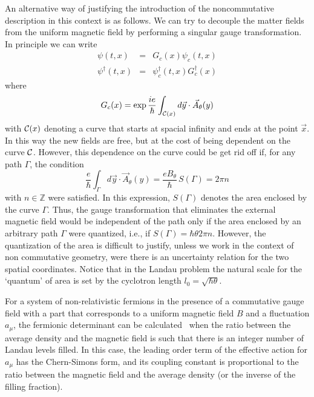\documentclass[a4paper,12pt]{article}
\begin{document}
An alternative way of justifying the introduction of the
noncommutative description in this context is as follows. We can
try
to decouple the matter fields from the uniform magnetic field by
performing a singular gauge transformation. In principle we can
write
\begin{eqnarray}
 \psi (t,x) &=& G_c (x) \psi_c(t,x) \nonumber \\
\psi^\dagger (t,x) &=&  \psi_c^\dagger (t,x) G_c^\dagger (x)
\end{eqnarray}
where
\begin{equation}
G_c(x)= \exp{{\frac{ie}{\hbar}}\int_{{\cal C}(x)} d{\vec
y}\cdot{\vec A}_{\theta}(y)}
\end{equation}
with ${\cal C}(x)$ denoting a curve that starts at spacial infinity
and ends at the point $\vec x$.  In this way the new fields are
free,
but at the cost of being dependent on the curve $\cal C$. However,
this dependence on the curve could be get rid off if, for any path
$\Gamma$, the condition
\begin{equation}
{{\frac{e}{\hbar}}\int_{\Gamma} d{\vec y} \cdot {\vec A}_\theta
(y)}= 
{\frac{e B_\theta}{\hbar}} \, S(\Gamma)= 2\pi n
\end{equation}
with $n \in \mathbb{Z}$ were satisfied. In this expression,
$S(\Gamma)$
denotes the area enclosed by the curve $\Gamma$. Thus, the gauge
transformation that eliminates the external magnetic field would be
independent of the path only if the area enclosed by an arbitrary
path
$\Gamma$ were quantized, i.e., if $S(\Gamma)= \hbar \theta 2\pi n$.
However, the
quantization of the area is difficult to justify, unless we work in
the context of non commutative geometry, were there is an
uncertainty
relation for the two spatial coordinates.  Notice that in the
Landau
problem the natural scale for the `quantum' of area is set by the
cyclotron length $l_0=\sqrt {\hbar \theta }$.

For a system of non-relativistic fermions in the presence of a
commutative gauge field with a part that corresponds to a uniform
magnetic field $B$ and a fluctuation $a_\mu$, the fermionic
determinant
can be calculated~\cite{lf} when the ratio between the average
density
and the magnetic field is such that there is an integer number of
Landau levels filled. In this case, the leading order term of the
effective action for $a_\mu$ has the Chern-Simons form, and its
coupling
constant is proportional to the ratio between the magnetic field
and
the average density (or the inverse of the filling fraction).
\end{document}
